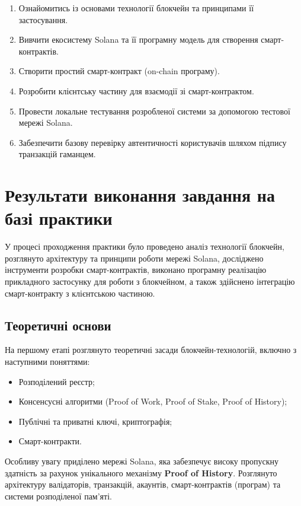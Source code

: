 \documentclass[14pt]{extreport}
\begin{document}
\begin{enumerate}
	\item Ознайомитись із основами технології блокчейн та принципами її застосування.
	\item Вивчити екосистему Solana та її програмну модель для створення смарт-контрактів.
	\item Створити простий смарт-контракт (on-chain програму).
	\item Розробити клієнтську частину для взаємодії зі смарт-контрактом.
	\item Провести локальне тестування розробленої системи за допомогою тестової мережі Solana.
	\item Забезпечити базову перевірку автентичності користувачів шляхом підпису транзакцій гаманцем.
\end{enumerate}

\section{Результати виконання завдання на базі практики}

У процесі проходження практики було проведено аналіз технології блокчейн, розглянуто архітектуру та принципи роботи мережі Solana, досліджено інструменти розробки смарт-контрактів, виконано програмну реалізацію прикладного застосунку для роботи з блокчейном, а також здійснено інтеграцію смарт-контракту з клієнтською частиною.

\subsection{Теоретичні основи}

На першому етапі розглянуто теоретичні засади блокчейн-технологій, включно з наступними поняттями:
\begin{itemize}
    \item Розподілений реєстр;
    \item Консенсусні алгоритми (Proof of Work, Proof of Stake, Proof of History);
    \item Публічні та приватні ключі, криптографія;
    \item Смарт-контракти.
\end{itemize}

Особливу увагу приділено мережі Solana, яка забезпечує високу пропускну здатність за рахунок унікального механізму \textbf{Proof of History}. Розглянуто архітектуру валідаторів, транзакцій, акаунтів, смарт-контрактів (програм) та системи розподіленої пам’яті.
\end{document}
